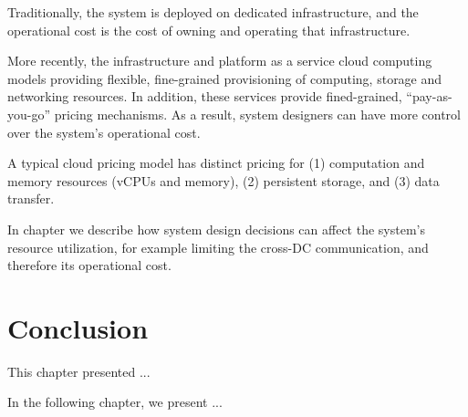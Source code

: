 Traditionally, the system is deployed on dedicated infrastructure, and the operational cost is the cost of owning and
operating that infrastructure.

More recently, the infrastructure and platform as a service cloud computing models providing flexible, fine-grained
provisioning of computing, storage and networking resources.
In addition, these services provide fined-grained, ``pay-as-you-go'' pricing mechanisms.
As a result, system designers can have more control over the system's operational cost.

A typical cloud pricing model \cite{aws:pricing} has distinct pricing for (1) computation and memory resources
(vCPUs and memory), (2) persistent storage, and (3) data transfer.

In chapter 
we describe how system design decisions can affect the system's resource utilization, for example limiting the cross-DC
communication, and therefore its operational cost.

\section{Conclusion}
This chapter presented ...

In the following chapter, we present ...


